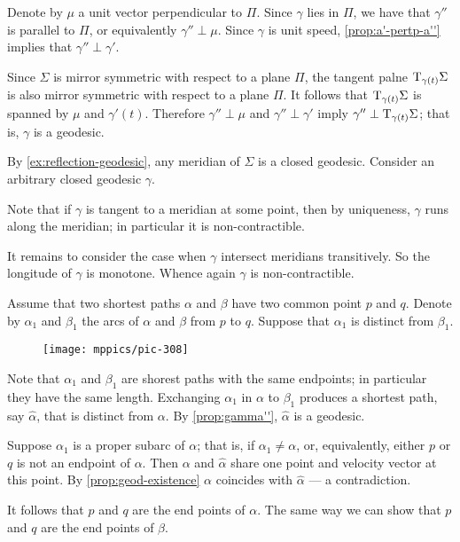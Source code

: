 Denote by $\mu$ a unit vector perpendicular to $\Pi$.
Since $\gamma$ lies in $\Pi$, we have that $\gamma''$ is parallel to $\Pi$, or equivalently $\gamma''\perp \mu$.
Since $\gamma$ is unit speed, \ref{prop:a'-pertp-a''} implies that $\gamma''\perp\gamma'$.

Since $\Sigma$ is mirror symmetric with respect to  a plane $\Pi$,
the tangent palne $\mathrm{T}_{\gamma(t)}\Sigma$ is also mirror symmetric with respect to  a plane $\Pi$.
It follows that $\mathrm{T}_{\gamma(t)}\Sigma$ is spanned by $\mu$ and $\gamma'(t)$.
Therefore $\gamma''\perp \mu$ and $\gamma''\perp\gamma'$ imply $\gamma''\perp\mathrm{T}_{\gamma(t)}\Sigma$;
that is, $\gamma$ is a geodesic.

By \ref{ex:reflection-geodesic}, any meridian of $\Sigma$ is a closed geodesic.
Consider an arbitrary closed geodesic $\gamma$.

Note that if $\gamma$ is tangent to a meridian at some point, then by uniqueness, $\gamma$ runs along the meridian; in particular it is non-contractible.

It remains to consider the case when $\gamma$ intersect meridians transitively. So the longitude of $\gamma$ is monotone.
Whence again $\gamma$ is non-contractible.

Assume that two shortest paths $\alpha$ and $\beta$ have two common point $p$ and $q$.
Denote by $\alpha_1$ and $\beta_1$ the arcs of
$\alpha$ and $\beta$ from $p$ to $q$.
Suppose that $\alpha_1$ is distinct from $\beta_1$.

\begin{wrapfigure}{r}{38 mm}
\vskip-0mm
\centering
\texttt{[image: mppics/pic-308]}
\vskip0mm
\end{wrapfigure}

Note that $\alpha_1$ and $\beta_1$ are shorest paths with the same endpoints;
in particular they have the same length.
Exchanging $\alpha_1$ in $\alpha$ to $\beta_1$ produces a shortest path, say $\hat\alpha$, that is distinct from $\alpha$.
By \ref{prop:gamma''}, $\hat\alpha$ is a geodesic.

Suppose $\alpha_1$ is a proper subarc of $\alpha$;
that is, if $\alpha_1\ne\alpha$, or, equivalently, either $p$ or $q$ is not an endpoint of $\alpha$.
Then $\alpha$ and $\hat\alpha$ share one point and velocity vector at this point.
By \ref{prop:geod-existence} $\alpha$ coincides with $\hat\alpha$ --- a contradiction.

It follows that $p$ and $q$ are the end points of $\alpha$.
The same way we can show that $p$ and $q$ are the end points of $\beta$.

